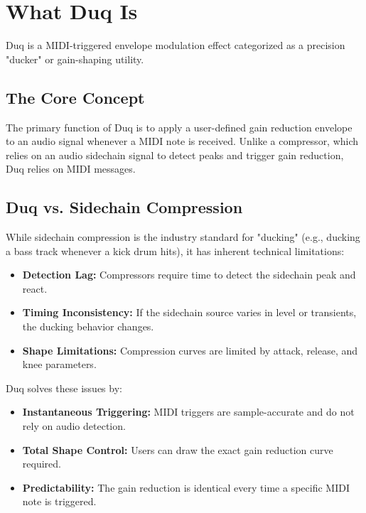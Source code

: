 \chapter{What Duq Is}
\label{ch:what_is_duq}

Duq is a MIDI-triggered envelope modulation effect categorized as a precision "ducker" or gain-shaping utility.

\section{The Core Concept}
The primary function of Duq is to apply a user-defined gain reduction envelope to an audio signal whenever a MIDI note is received. Unlike a compressor, which relies on an audio sidechain signal to detect peaks and trigger gain reduction, Duq relies on MIDI messages.

\section{Duq vs. Sidechain Compression}
While sidechain compression is the industry standard for "ducking" (e.g., ducking a bass track whenever a kick drum hits), it has inherent technical limitations:
\begin{itemize}
    \item \textbf{Detection Lag:} Compressors require time to detect the sidechain peak and react.
    \item \textbf{Timing Inconsistency:} If the sidechain source varies in level or transients, the ducking behavior changes.
    \item \textbf{Shape Limitations:} Compression curves are limited by attack, release, and knee parameters.
\end{itemize}

Duq solves these issues by:
\begin{itemize}
    \item \textbf{Instantaneous Triggering:} MIDI triggers are sample-accurate and do not rely on audio detection.
    \item \textbf{Total Shape Control:} Users can draw the exact gain reduction curve required.
    \item \textbf{Predictability:} The gain reduction is identical every time a specific MIDI note is triggered.
\end{itemize}
